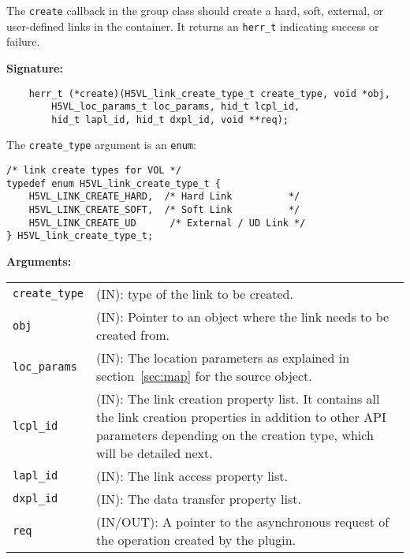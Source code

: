 The {\tt create} callback in the group class should create a hard,
soft, external, or user-defined links in the container. It returns an
{\tt herr\_t} indicating success or failure.

\textbf{Signature:}
\begin{lstlisting}
    herr_t (*create)(H5VL_link_create_type_t create_type, void *obj,
        H5VL_loc_params_t loc_params, hid_t lcpl_id, 
        hid_t lapl_id, hid_t dxpl_id, void **req);
\end{lstlisting}

The {\tt create\_type} argument is an {\tt enum}:
\begin{lstlisting}
/* link create types for VOL */
typedef enum H5VL_link_create_type_t {
    H5VL_LINK_CREATE_HARD,  /* Hard Link          */
    H5VL_LINK_CREATE_SOFT,  /* Soft Link          */
    H5VL_LINK_CREATE_UD      /* External / UD Link */
} H5VL_link_create_type_t;
\end{lstlisting}

\textbf{Arguments:}\\
\begin{tabular}{l p{10cm}}
  {\tt create\_type} & (IN): type of the link to be created.\\
  {\tt obj} & (IN): Pointer to an object where the link needs to be
  created from.\\
  {\tt loc\_params} & (IN): The location parameters as explained in
  section~\ref{sec:map} for the source object. \\
  {\tt lcpl\_id} & (IN): The link creation property list. It contains
  all the link creation properties in addition to other API parameters
  depending on the creation type, which will be detailed next.\\
  {\tt lapl\_id} & (IN): The link access property list.\\
  {\tt dxpl\_id} & (IN): The data transfer property list.\\
  {\tt req} & (IN/OUT): A pointer to the asynchronous request of the
  operation created by the plugin.\\
\end{tabular}

